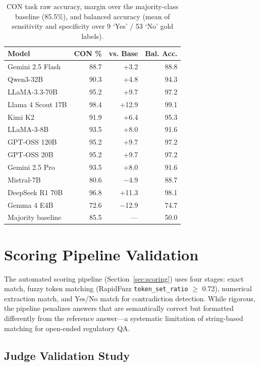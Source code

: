 \documentclass[11pt]{article}
\begin{document}
\begin{table}[t]
\centering\small
\begin{tabular}{lrrr}
\toprule
\textbf{Model} & \textbf{CON \%} & \textbf{vs. Base} & \textbf{Bal. Acc.} \\
\midrule
Gemini 2.5 Flash & 88.7 & +3.2 & 88.8 \\
Qwen3-32B & 90.3 & +4.8 & 94.3 \\
LLaMA-3.3-70B & 95.2 & +9.7 & 97.2 \\
Llama 4 Scout 17B & 98.4 & +12.9 & 99.1 \\
Kimi K2 & 91.9 & +6.4 & 95.3 \\
LLaMA-3-8B & 93.5 & +8.0 & 91.6 \\
GPT-OSS 120B & 95.2 & +9.7 & 97.2 \\
GPT-OSS 20B & 95.2 & +9.7 & 97.2 \\
Gemini 2.5 Pro & 93.5 & +8.0 & 91.6 \\
Mistral-7B & 80.6 & $-$4.9 & 88.7 \\
DeepSeek R1 70B & 96.8 & +11.3 & 98.1 \\
Gemma 4 E4B & 72.6 & $-$12.9 & 74.7 \\
\midrule
Majority baseline & 85.5 & --- & 50.0 \\
\bottomrule
\end{tabular}
\caption{CON task raw accuracy, margin over the majority-class baseline (85.5\%), and balanced accuracy (mean of sensitivity and specificity over 9 `Yes' / 53 `No' gold labels).}
\label{tab:c1}
\end{table}

\section{Scoring Pipeline Validation}
\label{app:judge}

The automated scoring pipeline (Section~\ref{sec:scoring}) uses four stages: exact match, fuzzy token matching (RapidFuzz \texttt{token\_set\_ratio} $\geq$ 0.72), numerical extraction match, and Yes/No match for contradiction detection. While rigorous, the pipeline penalizes answers that are semantically correct but formatted differently from the reference answer---a systematic limitation of string-based matching for open-ended regulatory QA.

\subsection{Judge Validation Study}
\end{document}
